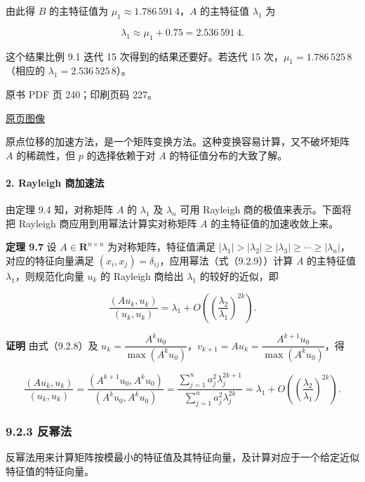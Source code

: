 由此得 \(B\) 的主特征值为 \(\mu_1\approx1.786\,591\,4\)，\(A\) 的主特征值 \(\lambda_1\) 为

\[
\lambda_1\approx\mu_1+0.75=2.536\,591\,4.
\]

这个结果比例 9.1 迭代 15 次得到的结果还要好。若迭代 15 次，\(\mu_1=1.786\,525\,8\)（相应的 \(\lambda_1=2.536\,525\,8\)）。

\clearpage

原书 PDF 页 240；印刷页码 227。

\href{source-images/pdf-240.jpeg}{原页图像}

原点位移的加速方法，是一个矩阵变换方法。这种变换容易计算，又不破坏矩阵 \(A\) 的稀疏性，但 \(p\) 的选择依赖于对 \(A\) 的特征值分布的大致了解。

\paragraph{2. Rayleigh 商加速法}\label{ch09a-rayleigh-ux5546ux52a0ux901fux6cd5}

由定理 9.4 知，对称矩阵 \(A\) 的 \(\lambda_1\) 及 \(\lambda_n\) 可用 Rayleigh 商的极值来表示。下面将把 Rayleigh 商应用到用幂法计算实对称矩阵 \(A\) 的主特征值的加速收敛上来。

\textbf{定理 9.7} 设 \(A\in\mathbf R^{n\times n}\) 为对称矩阵，特征值满足 \(|\lambda_1|>|\lambda_2|\geq|\lambda_3|\geq\cdots\geq|\lambda_n|\)，对应的特征向量满足 \((x_i,x_j)=\delta_{ij}\)，应用幂法（式（9.2.9））计算 \(A\) 的主特征值 \(\lambda_1\)，则规范化向量 \(u_k\) 的 Rayleigh 商给出 \(\lambda_1\) 的较好的近似，即

\[
\frac{(Au_k,u_k)}{(u_k,u_k)}=\lambda_1+O\left(\left(\frac{\lambda_2}{\lambda_1}\right)^{2k}\right).
\]

\textbf{证明} 由式（9.2.8）及 \(u_k=\dfrac{A^ku_0}{\max(A^ku_0)}\)，\(v_{k+1}=Au_k=\dfrac{A^{k+1}u_0}{\max(A^ku_0)}\)，得

\[
\frac{(Au_k,u_k)}{(u_k,u_k)}=\frac{(A^{k+1}u_0,A^ku_0)}{(A^ku_0,A^ku_0)}=\frac{\displaystyle\sum_{j=1}^na_j^2\lambda_j^{2k+1}}{\displaystyle\sum_{j=1}^na_j^2\lambda_j^{2k}}=\lambda_1+O\left(\left(\frac{\lambda_2}{\lambda_1}\right)^{2k}\right).
\tag{9.2.11}
\]

\subsubsection{9.2.3 反幂法}\label{ch09a-ux53cdux5e42ux6cd5}

反幂法用来计算矩阵按模最小的特征值及其特征向量，及计算对应于一个给定近似特征值的特征向量。

